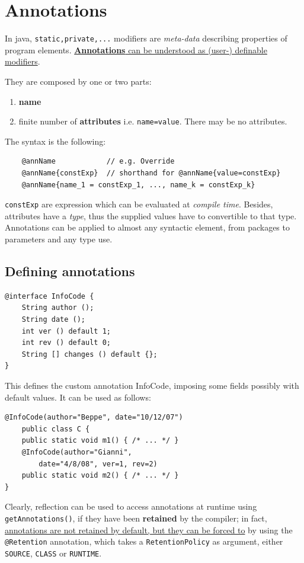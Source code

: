 \section{Annotations}
In java, \lstinline{static,private,...} modifiers are \textit{meta-data} describing properties of program elements.
\ul{\textbf{Annotations} can be understood as (user-) definable modifiers}.
{They are composed by one or two parts:\ns
\begin{enumerate}
    \item \textbf{name}
    \item finite number of \textbf{attributes} i.e. \lstinline{name=value}.
    There may be no attributes.
\end{enumerate}}
The syntax is the following:
\begin{lstlisting}
    @annName            // e.g. Override
    @annName{constExp}  // shorthand for @annName{value=constExp}
    @annName{name_1 = constExp_1, ..., name_k = constExp_k}
\end{lstlisting}
\lstinline{constExp} are expression which can be evaluated at \textit{compile time}.
Besides, attributes have a \textit{type}, thus the supplied values have to
convertible to that type.\\
Annotations can be applied to almost any syntactic element, from packages to parameters and any type use.

\subsection{Defining annotations}
\begin{lstlisting}
@interface InfoCode {
    String author ();
    String date ();
    int ver () default 1;
    int rev () default 0;
    String [] changes () default {};
}
\end{lstlisting}

This defines the custom annotation InfoCode, imposing some fields possibly with default values.
It can be used as follows:
\begin{lstlisting}
@InfoCode(author="Beppe", date="10/12/07")
    public class C {
    public static void m1() { /* ... */ }
    @InfoCode(author="Gianni",
        date="4/8/08", ver=1, rev=2)
    public static void m2() { /* ... */ }
}
\end{lstlisting}

Clearly, reflection can be used to access annotations at runtime using \lstinline|getAnnotations()|, if they have been \textbf{retained} by the compiler;
in fact, \ul{annotations are not retained by default, but they can be forced to} by using the \lstinline{@Retention} annotation, which takes a \lstinline{RetentionPolicy} as argument, either \lstinline{SOURCE}, \lstinline{CLASS} or \lstinline{RUNTIME}.